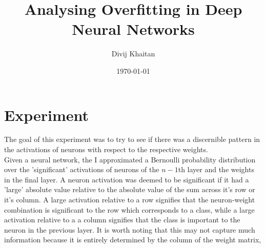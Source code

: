 \documentclass{article}
\title{Analysing Overfitting in Deep Neural Networks}
\author{Divij Khaitan}
\date{\today}
\begin{document}
    \maketitle

    \section*{Experiment}
        The goal of this experiment was to try to see if there was a discernible pattern in the activations of neurons with respect to the respective weights. \\
        
        Given a neural network, the I approximated a Bernoulli probability distribution over the 'significant' activations of neurons of the $n-1$th layer and the weights in the final layer. A neuron activation was deemed to be significant if it had a 'large' absolute value relative to the absolute value of the sum across it's row or it's column. A large activation relative to a row signifies that the neuron-weight combination is significant to the row which corresponds to a class, while a large activation relative to a a column signifies that the class is important to the neuron in the previous layer. It is worth noting that this may not capture much information because it is entirely determined by the column of the weight matrix, \\
\end{document}
